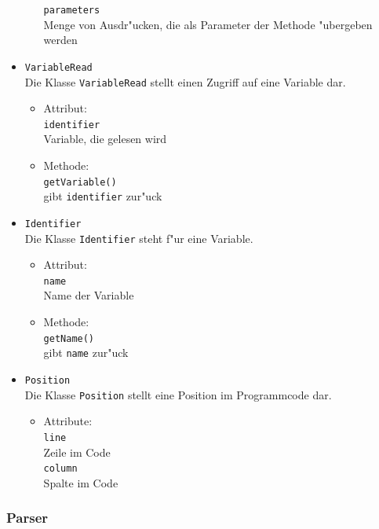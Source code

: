 \documentclass[10pt,a4paper,titlepage]{article}
\begin{document}
\begin{itemize}
\begin{itemize}
\texttt{parameters} \\
Menge von Ausdr"ucken, die als Parameter der Methode "ubergeben werden
\end{itemize}
\item \texttt{VariableRead} \\
Die Klasse \texttt{VariableRead} stellt einen Zugriff auf eine Variable dar.
\begin{itemize}
\item Attribut: \\
\texttt{identifier} \\
Variable, die gelesen wird
\item Methode: \\
\texttt{getVariable()} \\
gibt \texttt{identifier} zur"uck
\end{itemize}
\item \texttt{Identifier} \\
Die Klasse \texttt{Identifier} steht f"ur eine Variable. 
\begin{itemize}
\item Attribut: \\
\texttt{name} \\
Name der Variable 
\item Methode: \\
\texttt{getName()} \\
gibt \texttt{name} zur"uck  
\end{itemize}
\item \texttt{Position} \\
Die Klasse \texttt{Position} stellt eine Position im Programmcode dar. 
\begin{itemize}
\item Attribute: \\
\texttt{line} \\
Zeile im Code \\
\texttt{column} \\
Spalte im Code \\
\end{itemize}
\end{itemize}

\subsubsection{Parser}
\end{document}
